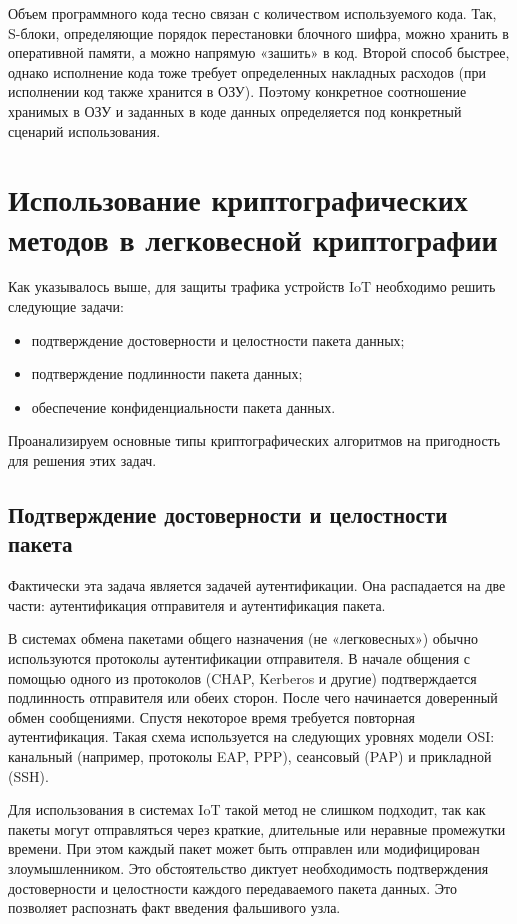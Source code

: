 Объем программного кода тесно связан с количеством используемого кода. Так, S-блоки, определяющие порядок перестановки блочного шифра, можно хранить в оперативной памяти, а можно напрямую «зашить» в код. Второй способ быстрее, однако исполнение кода тоже требует определенных накладных расходов (при исполнении код также хранится в ОЗУ). Поэтому конкретное соотношение хранимых в ОЗУ и заданных в коде данных определяется под конкретный сценарий использования.

\section{Использование криптографических методов в легковесной криптографии} \label{ch2:sec2}

Как указывалось выше, для защиты трафика устройств IoT необходимо решить следующие задачи:
\begin{itemize}
	\item подтверждение достоверности и целостности пакета данных;
	\item подтверждение подлинности пакета данных;
	\item обеспечение конфиденциальности пакета данных.
\end{itemize}

Проанализируем основные типы криптографических алгоритмов на пригодность для решения этих задач.

\subsection{Подтверждение достоверности и целостности пакета}

Фактически эта задача является задачей аутентификации. Она распадается на две части: аутентификация отправителя и аутентификация пакета.

В системах обмена пакетами общего назначения (не «легковесных») обычно используются протоколы аутентификации отправителя. В начале общения с помощью одного из протоколов (CHAP, Kerberos и другие) подтверждается подлинность отправителя или обеих сторон. После чего начинается доверенный обмен сообщениями. Спустя некоторое время требуется повторная аутентификация. Такая схема используется на следующих уровнях модели OSI: канальный (например, протоколы EAP, PPP), сеансовый (PAP) и прикладной (SSH).

Для использования в системах IoT такой метод не слишком подходит, так как пакеты могут отправляться через краткие, длительные или неравные промежутки времени. При этом каждый пакет может быть отправлен или модифицирован злоумышленником. Это обстоятельство диктует необходимость подтверждения достоверности и целостности каждого передаваемого пакета данных. Это позволяет распознать факт введения фальшивого узла.

